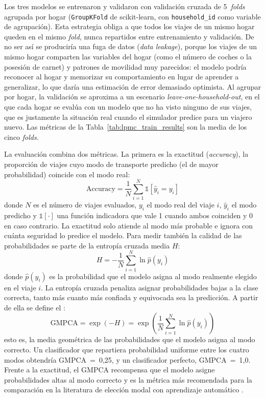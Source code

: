 Los tres modelos se entrenaron y validaron con validación cruzada de 5~\textit{folds} agrupada por hogar (\texttt{GroupKFold} de scikit-learn, con \texttt{household\_id} como variable de agrupación). Esta estrategia obliga a que todos los viajes de un mismo hogar queden en el mismo \textit{fold}, nunca repartidos entre entrenamiento y validación. De no ser así se produciría una fuga de datos (\textit{data leakage}), porque los viajes de un mismo hogar comparten las variables del hogar (como el número de coches o la posesión de carnet) y patrones de movilidad muy parecidos: el modelo podría reconocer al hogar y memorizar su comportamiento en lugar de aprender a generalizar, lo que daría una estimación de error demasiado optimista. Al agrupar por hogar, la validación se aproxima a un escenario \textit{leave-one-household-out}, en el que cada hogar se evalúa con un modelo que no ha visto ninguno de sus viajes, que es justamente la situación real cuando el simulador predice para un viajero nuevo. Las métricas de la Tabla~\ref{tab:lpmc_train_results} son la media de los cinco \textit{folds}.

La evaluación combina dos métricas. La primera es la exactitud (\textit{accuracy}), la proporción de viajes cuyo modo de transporte predicho (el de mayor probabilidad) coincide con el modo real:
\begin{equation}
  \label{eq:accuracy}
  \text{Accuracy} = \frac{1}{N}\sum_{i=1}^{N} \mathbb{1}\!\left[\hat{y}_i = y_i\right]
\end{equation}
donde $N$ es el número de viajes evaluados, $y_i$ el modo real del viaje $i$, $\hat{y}_i$ el modo predicho y $\mathbb{1}[\cdot]$ una función indicadora que vale 1 cuando ambos coinciden y 0 en caso contrario. La exactitud solo atiende al modo más probable e ignora con cuánta seguridad lo predice el modelo.
\newpage
Para medir también la calidad de las probabilidades se parte de la entropía cruzada media $H$:
\begin{equation}
  \label{eq:crossentropy}
  H = -\frac{1}{N}\sum_{i=1}^{N} \ln \hat{p}(y_i)
\end{equation}
donde $\hat{p}(y_i)$ es la probabilidad que el modelo asigna al modo realmente elegido en el viaje $i$. La entropía cruzada penaliza asignar probabilidades bajas a la clase correcta, tanto más cuanto más confiada y equivocada sea la predicción. A partir de ella se define el :
\begin{equation}
  \label{eq:gmpca}
  \text{GMPCA} = \exp(-H) = \exp\!\left(\frac{1}{N}\sum_{i=1}^{N} \ln \hat{p}(y_i)\right)
\end{equation}
esto es, la media geométrica de las probabilidades que el modelo asigna al modo correcto. Un clasificador que repartiera probabilidad uniforme entre los cuatro modos obtendría GMPCA~=~0,25, y un clasificador perfecto, GMPCA~=~1,0. Frente a la exactitud, el GMPCA recompensa que el modelo asigne probabilidades altas al modo correcto y es la métrica más recomendada para la comparación en la literatura de elección modal con aprendizaje automático \cite{MartinBaos2023TRC}.

